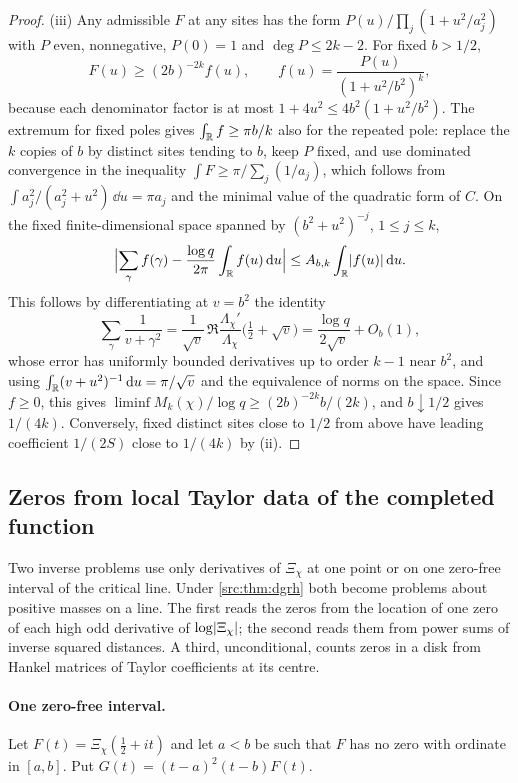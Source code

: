 \begin{proof}
(iii) Any admissible $F$ at any sites has the form $P(u)/\prod_j(1+u^2/a_j^2)$ with $P$ even, nonnegative,
$P(0)=1$ and $\deg P\le2k-2$. For fixed $b>1/2$,
\[
 F(u)\ge(2b)^{-2k}f(u),\qquad f(u)=\frac{P(u)}{(1+u^2/b^2)^k},
\]
because each denominator factor is at most $1+4u^2\le4b^2(1+u^2/b^2)$. The extremum for fixed poles gives
$\int_{\mathbb{R}} f\ge\pi b/k$ also for the repeated pole: replace the $k$ copies of $b$ by distinct sites tending
to $b$, keep $P$ fixed, and use dominated convergence in the inequality $\int F\ge\pi/\sum_j(1/a_j)$,
which follows from $\int a_j^2/(a_j^2+u^2)\,\dd u=\pi a_j$ and the minimal value of the quadratic form of
$C$. On the fixed finite-dimensional space spanned by $(b^2+u^2)^{-j}$, $1\le j\le k$,
\[
 \Bigl\lvert\sum_\gamma f(\gamma)-\frac{\log q}{2\pi}\int_{\mathbb{R}} f(u)\,\mathrm{d} u\Bigr\rvert
 \le A_{b,k}\int_{\mathbb{R}}\lvert f(u)\rvert\,\mathrm{d} u .
\]
This follows by differentiating at $v=b^2$ the identity
\[
 \sum_\gamma\frac1{v+\gamma^2}=\frac1{\sqrt v}\,\Re\frac{\Lambda_\chi'}{\Lambda_\chi}\bigl(\tfrac12+\sqrt v\bigr)
 =\frac{\log q}{2\sqrt v}+O_b(1),
\]
whose error has uniformly bounded derivatives up to order $k-1$ near $b^2$, and using
$\int_{\mathbb{R}}(v+u^2)^{-1}\,\mathrm{d} u=\pi/\sqrt v$ and the equivalence of norms on the space. Since $f\ge0$, this gives
$\liminf M_k(\chi)/\log q\ge(2b)^{-2k}b/(2k)$, and $b\downarrow1/2$ gives $1/(4k)$. Conversely, fixed
distinct sites close to $1/2$ from above have leading coefficient $1/(2S)$ close to $1/(4k)$ by (ii).
\end{proof}

\subsection{Zeros from local Taylor data of the completed function}\label{rec:sec:taylor}

Two inverse problems use only derivatives of $\Xi_\chi$ at one point or on one zero-free
interval of the critical line. Under \cref{src:thm:dgrh} both become problems about positive
masses on a line. The first reads the zeros from the location of one zero of each high odd
derivative of $\log\lvert\Xi_\chi\rvert$; the second reads them from power sums of inverse squared
distances. A third, unconditional, counts zeros in a disk from Hankel matrices of Taylor coefficients at its centre.

\paragraph{One zero-free interval.}
Let $F(t)=\Xi_\chi(\tfrac12+it)$ and let $a<b$ be such that $F$ has no zero with ordinate in
$[a,b]$. Put $G(t)=(t-a)^2(t-b)F(t)$.

